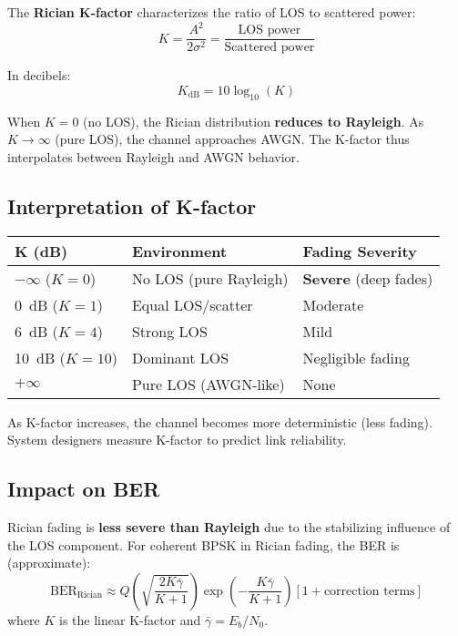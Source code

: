 The \textbf{Rician K-factor} characterizes the ratio of LOS to scattered power:
\begin{equation}
K = \frac{A^2}{2\sigma^2} = \frac{\text{LOS power}}{\text{Scattered power}}
\end{equation}

In decibels:
\begin{equation}
K_{\text{dB}} = 10\log_{10}(K)
\end{equation}

\begin{keyconcept}
When $K = 0$ (no LOS), the Rician distribution \textbf{reduces to Rayleigh}. As $K \to \infty$ (pure LOS), the channel approaches AWGN. The K-factor thus interpolates between Rayleigh and AWGN behavior.
\end{keyconcept}

\subsection{Interpretation of K-factor}

\begin{center}
\begin{tabular}{lll}
\toprule
\textbf{K (dB)} & \textbf{Environment} & \textbf{Fading Severity} \\
\midrule
$-\infty$ ($K=0$) & No LOS (pure Rayleigh) & \textbf{Severe} (deep fades) \\
0~dB ($K=1$) & Equal LOS/scatter & Moderate \\
6~dB ($K=4$) & Strong LOS & Mild \\
10~dB ($K=10$) & Dominant LOS & Negligible fading \\
$+\infty$ & Pure LOS (AWGN-like) & None \\
\bottomrule
\end{tabular}
\end{center}

As K-factor increases, the channel becomes more deterministic (less fading). System designers measure K-factor to predict link reliability.

\subsection{Impact on BER}

Rician fading is \textbf{less severe than Rayleigh} due to the stabilizing influence of the LOS component. For coherent BPSK in Rician fading, the BER is (approximate):
\begin{equation}
\text{BER}_{\text{Rician}} \approx Q\left(\sqrt{\frac{2K\bar{\gamma}}{K+1}}\right) \exp\left(-\frac{K\bar{\gamma}}{K+1}\right) \left[1 + \text{correction terms}\right]
\end{equation}
where $K$ is the linear K-factor and $\bar{\gamma} = E_b/N_0$.


